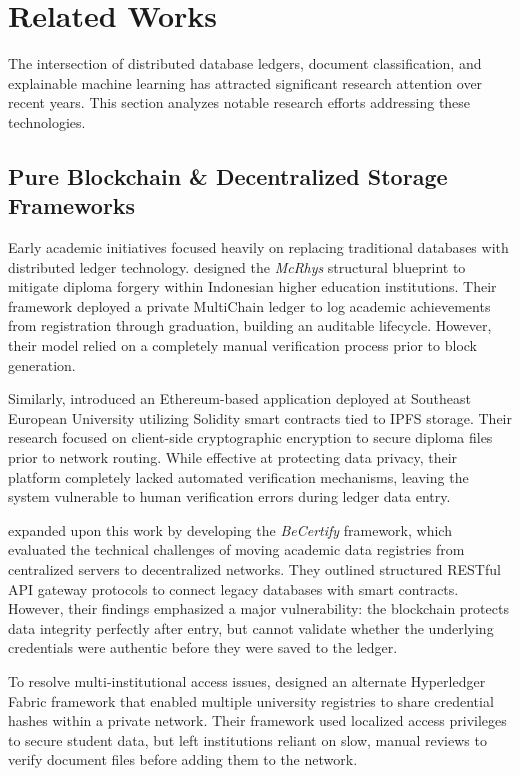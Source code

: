 \section{Related Works}
The intersection of distributed database ledgers, document classification, and explainable machine learning has attracted significant research attention over recent years. This section analyzes notable research efforts addressing these technologies.

\subsection{Pure Blockchain \& Decentralized Storage Frameworks}
Early academic initiatives focused heavily on replacing traditional databases with distributed ledger technology.  \cite{meyliana2020education} designed the \textit{McRhys} structural blueprint to mitigate diploma forgery within Indonesian higher education institutions. Their framework deployed a private MultiChain ledger to log academic achievements from registration through graduation, building an auditable lifecycle. However, their model relied on a completely manual verification process prior to block generation.

Similarly, \cite{leka2021development} introduced an Ethereum-based application deployed at Southeast European University utilizing Solidity smart contracts tied to IPFS storage. Their research focused on client-side cryptographic encryption to secure diploma files prior to network routing. While effective at protecting data privacy, their platform completely lacked automated verification mechanisms, leaving the system vulnerable to human verification errors during ledger data entry.

\cite{maestre2023application} expanded upon this work by developing the \textit{BeCertify} framework, which evaluated the technical challenges of moving academic data registries from centralized servers to decentralized networks. They outlined structured RESTful API gateway protocols to connect legacy databases with smart contracts. However, their findings emphasized a major vulnerability: the blockchain protects data integrity perfectly after entry, but cannot validate whether the underlying credentials were authentic before they were saved to the ledger.

To resolve multi-institutional access issues,  \cite{almansoori2024multichain} designed an alternate Hyperledger Fabric framework that enabled multiple university registries to share credential hashes within a private network. Their framework used localized access privileges to secure student data, but left institutions reliant on slow, manual reviews to verify document files before adding them to the network.

